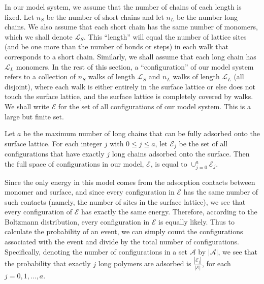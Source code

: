 \documentclass[journal=mamobx,manuscript=article]{achemso}
\newcommand{\leng}{\mathcal{L}}
\begin{document}
In our model system, we assume that the number of chains of each length is fixed.  
Let $n_S$ be the number of short chains
and let $n_L$ be the number long chains.
We also assume that each
short chain has the same number of monomers, 
which we shall denote $\leng_S$.  This ``length'' 
will equal the number of lattice sites (and be one
more than the number of bonds or steps) in each
walk that corresponds to a short chain.
Similarly, we shall assume that each long 
chain has $\leng_L$ monomers.
In the rest of this section, a ``configuration''
of our model system refers to a collection of $n_S$
walks of length $\leng_S$ and $n_L$ walks of length
$\leng_L$ (all disjoint), 
where each walk is either entirely in the 
surface lattice or else does not touch the surface
lattice, and the surface lattice is completely 
covered by walks.  
We shall write $\mathcal{E}$ for the 
set of all configurations of our model system.
This is a large but finite set.

Let $a$ be the maximum number of long chains that
can be fully adsorbed onto the surface lattice.
For each integer $j$ with $0\leq j\leq a$, let
$\mathcal{E}_j$ be the set of all configurations that have exactly $j$ long chains adsorbed 
onto the surface.  
Then the full space of configurations in our model,
$\mathcal{E}$, is equal to 
$\cup_{j=0}^a {\mathcal{E}_j}$. 

Since the only energy in this model comes from the adsorption contacts between monomer and surface,
and since every configuration in $\mathcal{E}$ has the same number of such contacts
(namely, the number of sites in the surface lattice),
we see that every configuration of $\mathcal{E}$ has exactly the same energy.
Therefore, according to the Boltzmann distribution, every configuration in $\mathcal{E}$ is equally
likely. Thus to calculate the probability of an event, we can simply count the configurations associated with the event and divide by the total number of configurations.
Specifically, denoting the number of configurations in a set $\mathcal{A}$ by $|\mathcal{A}|$, we see that
the probability that exactly $j$ long polymers are adsorbed is $\frac{|\mathcal{E}_j|}{|\mathcal{E}|}$,
for each $j=0,1,\ldots,a$.
\end{document}
